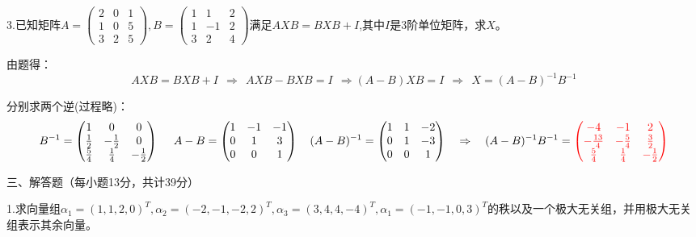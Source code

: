 \documentclass{article}
\begin{document}
3.已知矩阵$A=
\begin{pmatrix}
  2 & 0 &1 \\
  1 & 0 &5\\
  3 & 2 &5
\end{pmatrix}
,B=\begin{pmatrix}
  1& 1 &2 \\
  1 & -1 &2\\
  3 & 2 &4
\end{pmatrix}$满足$AXB=BXB+I$,其中$I$是3阶单位矩阵，求$X$。

\begin{jie}
由题得：
\begin{equation*}
AXB=BXB+I~~\Rightarrow~~AXB-BXB=I~~\Rightarrow(A-B)XB=I~~\Rightarrow~~X=(A-B)^{-1}B^{-1}
\end{equation*}

分别求两个逆(过程略)：
\begin{equation*}
B^{-1}=
\begin{pmatrix}
  1 & 0 & 0\\
 \frac{1}{2}&-\frac{1}{2}&0\\
 \frac{5}{4}&\frac{1}{4}&-\frac{1}{2}
\end{pmatrix}~~~~
A-B=
\begin{pmatrix}
  1 & -1 & -1 \\
  0 & 1 & 3\\
  0 & 0 & 1
\end{pmatrix}~~~(A-B)^{-1}=
\begin{pmatrix}
 1& 1&-2\\
  0 & 1 & -3\\
  0&0&1
\end{pmatrix}~~~\Rightarrow~~~(A-B)^{-1}B^{-1}=
\textcolor[rgb]{1.00,0.00,0.00}{\begin{pmatrix}
  -4 & -1 &2 \\
 -\frac{13}{4} & -\frac{5}{4} &\frac{3}{2}\\
 \frac{5}{4}&\frac{1}{4}&-\frac{1}{2}
\end{pmatrix}}
\end{equation*}
\end{jie}

\hphantom{1}

三、解答题（每小题13分，共计39分）

1.求向量组$\alpha_1=(1,1,2,0)^T,\alpha_2=(-2,-1,-2,2)^T,\alpha_3=(3,4,4,-4)^T,\alpha_1=(-1,-1,0,3)^T$的秩以及一个极大无关组，并用极大无关组表示其余向量。
\end{document}
